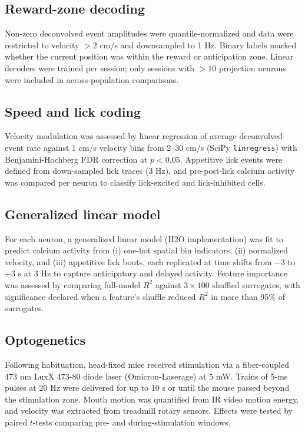 \documentclass[11pt]{article}
\begin{document}
\subsection{Reward-zone decoding}

Non-zero deconvolved event amplitudes were quantile-normalized and data were restricted to velocity $>2$ cm/s and downsampled to 1 Hz. Binary labels marked whether the current position was within the reward or anticipation zone. Linear decoders were trained per session; only sessions with $>10$ projection neurons were included in across-population comparisons.

\subsection{Speed and lick coding}

Velocity modulation was assessed by linear regression of average deconvolved event rate against 1 cm/s velocity bins from 2--30 cm/s (SciPy \texttt{linregress}) with Benjamini-Hochberg FDR correction at $p<0.05$. Appetitive lick events were defined from down-sampled lick traces (3 Hz), and pre-post-lick calcium activity was compared per neuron to classify lick-excited and lick-inhibited cells.

\subsection{Generalized linear model}

For each neuron, a generalized linear model (H2O implementation) was fit to predict calcium activity from (i) one-hot spatial bin indicators, (ii) normalized velocity, and (iii) appetitive lick bouts, each replicated at time shifts from $-3$ to $+3$ s at 3 Hz to capture anticipatory and delayed activity. Feature importance was assessed by comparing full-model $R^2$ against $3\times100$ shuffled surrogates, with significance declared when a feature's shuffle reduced $R^2$ in more than 95\% of surrogates.

\subsection{Optogenetics}

Following habituation, head-fixed mice received stimulation via a fiber-coupled 473 nm LuxX 473-80 diode laser (Omicron-Laserage) at 5 mW. Trains of 5-ms pulses at 20 Hz were delivered for up to 10 s or until the mouse passed beyond the stimulation zone. Mouth motion was quantified from IR video motion energy, and velocity was extracted from treadmill rotary sensors. Effects were tested by paired $t$-tests comparing pre- and during-stimulation windows.
\end{document}
